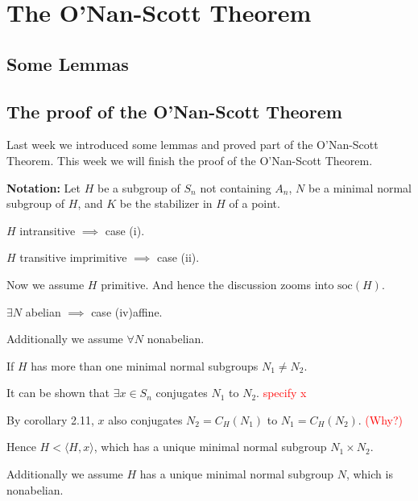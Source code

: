 \documentclass[a4paper,11pt]{article}
\def\maintitle#1{\section*{#1}}
\def\subtitle#1{\section{#1}}
\begin{document}
\else %
    \ifx\chaptitle\undefined %
        \def\maintitle#1{\subsection{#1}}
        \def\subtitle#1{\subsubsection{#1}}
    \else %
        \def\maintitle#1{\section{#1}}
        \def\subtitle#1{\subsection{#1}}
    \fi
\fi


\maintitle{The O'Nan-Scott Theorem}
\subtitle{Some Lemmas}
\subtitle{The proof of the O'Nan-Scott Theorem}

Last week we introduced some lemmas and proved part of the O'Nan-Scott Theorem. This week we will finish the proof of the O'Nan-Scott Theorem.

\noindent\textbf{Notation:} Let $H$ be a subgroup of $S_n$ not containing $A_n$, $N$ be a minimal normal subgroup of $H$, and $K$ be the stabilizer in $H$ of a point.

$H$ intransitive $\implies$ case (i).

$H$ transitive imprimitive $\implies$ case (ii).

\noindent Now we assume $H$ primitive. And hence the discussion zooms into $\mathrm{soc}(H)$.

$\exists N$ abelian $\implies$ case (iv)affine.

\noindent Additionally we assume $\forall N$ nonabelian. 

If $H$ has more than one minimal normal subgroups $N_1\neq N_2$. 

It can be shown that $\exists x\in S_n$ conjugates $N_1$ to $N_2$. \textcolor{red}{specify x}

By corollary 2.11, $x$ also conjugates $N_2=C_H(N_1)$ to $N_1=C_H(N_2)$. \textcolor{red}{(Why?)} 

Hence $H<\langle H,x\rangle$, which has a unique minimal normal subgroup $N_1\times N_2$.

\noindent Additionally we assume $H$ has a unique minimal normal subgroup $N$, which is nonabelian.
\end{document}
